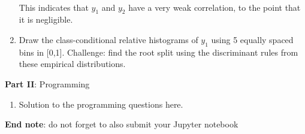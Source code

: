\documentclass[12pt]{article}
\begin{document}
\begin{enumerate}[leftmargin=\labelsep]
    \paragraph{}This indicates that $y_1$ and $y_2$ have a very weak correlation, to the point that it is negligible.

    \item Draw the class-conditional relative histograms of $y_1$ using 5 equally spaced bins in [0,1].
    Challenge: find the root split using the discriminant rules from these empirical distributions.    
\end{enumerate}

\large{\textbf{Part II}: Programming}\normalsize

\begin{enumerate}[leftmargin=\labelsep,resume]
\item Solution to the programming questions here.
\end{enumerate}

\vskip 1cm
\textbf{End note}: do not forget to also submit your Jupyter notebook
\end{document}
